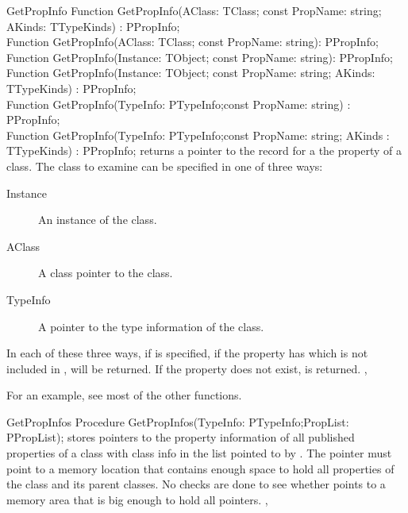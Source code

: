 
\begin{function}{GetPropInfo}
\Declaration
Function GetPropInfo(AClass: TClass; const PropName: string; AKinds: TTypeKinds) : PPropInfo;\\
Function GetPropInfo(AClass: TClass; const PropName: string): PPropInfo;\\
Function GetPropInfo(Instance: TObject; const PropName: string): PPropInfo;\\
Function GetPropInfo(Instance: TObject; const PropName: string; AKinds: TTypeKinds) : PPropInfo;\\
Function GetPropInfo(TypeInfo: PTypeInfo;const PropName: string) : PPropInfo;\\
Function GetPropInfo(TypeInfo: PTypeInfo;const PropName: string; AKinds : TTypeKinds) : PPropInfo;
\Description
{} returns a pointer to the  record for a the 
 property of a class. The class to examine can be specified 
in one of three ways:
\begin{description}
\item[Instance] An instance of the class.
\item[AClass] A class pointer to the class.
\item[TypeInfo] A pointer to the type information of the class.
\end{description}
In each of these three ways, if  is specified, if the property 
has  which is not included in ,  will be
returned.
\Errors
If the property  does not exist,  is returned.
\SeeAlso
{},
\end{function}

For an example, see most of the other functions.

\begin{procedure}{GetPropInfos}
\Declaration
Procedure GetPropInfos(TypeInfo: PTypeInfo;PropList: PPropList);
\Description
{} stores pointers to the property information of all published
properties of a class with class info  in the list pointed to by
. The  pointer must point to a memory location that
contains enough space to hold all properties of the class and its parent classes.
\Errors
No checks are done to see whether  points to a memory area that 
is big enough to hold all pointers.
\SeeAlso
{},
\end{procedure}


